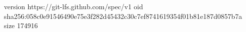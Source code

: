 version https://git-lfs.github.com/spec/v1
oid sha256:058c0e91546490e75e3f282d45432c30c7ef8741619354f01b81e187d0857b7a
size 174916
